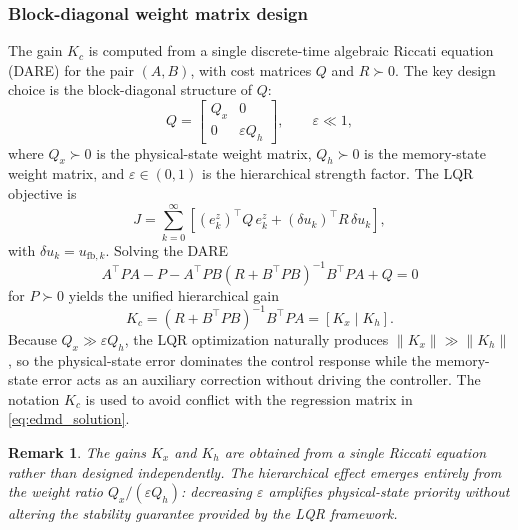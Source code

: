 \documentclass[journal]{IEEEtran}
\newtheorem{remark}{Remark}
\begin{document}
\subsubsection*{Block-diagonal weight matrix design}

The gain $K_c$ is computed from a single discrete-time algebraic Riccati equation (DARE) for the pair $(A,B)$, with cost matrices $Q$ and $R \succ 0$. The key design choice is the block-diagonal structure of $Q$:
\begin{equation}
    Q = \begin{bmatrix} Q_x & 0 \\ 0 & \varepsilon Q_h \end{bmatrix},
    \qquad \varepsilon \ll 1,
    \label{eq:block_diag_Q}
\end{equation}
where $Q_x \succ 0$ is the physical-state weight matrix, $Q_h \succ 0$ is the memory-state weight matrix, and $\varepsilon \in (0,1)$ is the hierarchical strength factor. The LQR objective is
\begin{equation}
    J = \sum_{k=0}^{\infty}
    \left[(e_k^z)^\top Q\, e_k^z + (\delta u_k)^\top R\,\delta u_k\right],
    \label{eq:lqr_objective}
\end{equation}
with $\delta u_k = u_{\mathrm{fb},k}$. Solving the DARE
\begin{equation}
    A^\top P A - P - A^\top P B(R + B^\top P B)^{-1}B^\top P A + Q = 0
    \label{eq:dare}
\end{equation}
for $P \succ 0$ yields the unified hierarchical gain
\begin{equation}
    K_c = (R + B^\top P B)^{-1}B^\top P A = [K_x\;|\;K_h].
    \label{eq:lqr_gain}
\end{equation}
Because $Q_x \gg \varepsilon Q_h$, the LQR optimization naturally produces $\|K_x\| \gg \|K_h\|$, so the physical-state error dominates the control response while the memory-state error acts as an auxiliary correction without driving the controller. The notation $K_c$ is used to avoid conflict with the regression matrix in \eqref{eq:edmd_solution}.

\begin{remark}
The gains $K_x$ and $K_h$ are obtained from a single Riccati equation rather than designed independently. The hierarchical effect emerges entirely from the weight ratio $Q_x / (\varepsilon Q_h)$: decreasing $\varepsilon$ amplifies physical-state priority without altering the stability guarantee provided by the LQR framework.
\end{remark}
\end{document}
